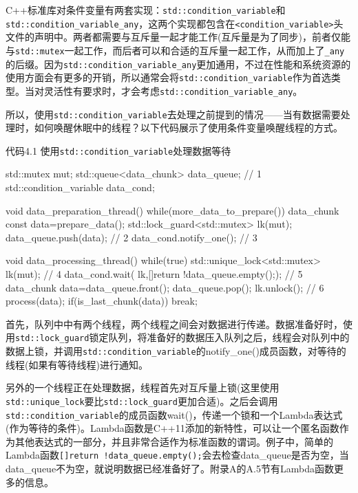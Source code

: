C++标准库对条件变量有两套实现：\texttt{std::condition\_variable}和\texttt{std::condition\_variable\_any}，这两个实现都包含在\texttt{<condition\_variable>}头文件的声明中。两者都需要与互斥量一起才能工作(互斥量是为了同步)，前者仅能与\texttt{std::mutex}一起工作，而后者可以和合适的互斥量一起工作，从而加上了\texttt{\_any}的后缀。因为\texttt{std::condition\_variable\_any}更加通用，不过在性能和系统资源的使用方面会有更多的开销，所以通常会将\texttt{std::condition\_variable}作为首选类型。当对灵活性有要求时，才会考虑\texttt{std::condition\_variable\_any}。

所以，使用\texttt{std::condition\_variable}去处理之前提到的情况——当有数据需要处理时，如何唤醒休眠中的线程？以下代码展示了使用条件变量唤醒线程的方式。

代码4.1 使用\texttt{std::condition\_variable}处理数据等待

\begin{cpp}
std::mutex mut;
std::queue<data_chunk> data_queue;  // 1
std::condition_variable data_cond;

void data_preparation_thread()
{
  while(more_data_to_prepare())
  {
    data_chunk const data=prepare_data();
    std::lock_guard<std::mutex> lk(mut);
    data_queue.push(data);  // 2
    data_cond.notify_one();  // 3
  }
}

void data_processing_thread()
{
  while(true)
  {
    std::unique_lock<std::mutex> lk(mut);  // 4
    data_cond.wait(
         lk,[]{return !data_queue.empty();});  // 5
    data_chunk data=data_queue.front();
    data_queue.pop();
    lk.unlock();  // 6
    process(data);
    if(is_last_chunk(data))
      break;
  }
}
\end{cpp}

首先，队列中中有两个线程，两个线程之间会对数据进行传递。数据准备好时，使用\texttt{std::lock\_guard}锁定队列，将准备好的数据压入队列之后，线程会对队列中的数据上锁，并调用\texttt{std::condition\_variable}的notify\_one()成员函数，对等待的线程(如果有等待线程)进行通知。

另外的一个线程正在处理数据，线程首先对互斥量上锁(这里使用\texttt{std::unique\_lock}要比\texttt{std::lock\_guard}更加合适)。之后会调用\texttt{std::condition\_variable}的成员函数wait()，传递一个锁和一个Lambda表达式(作为等待的条件)。Lambda函数是C++11添加的新特性，可以让一个匿名函数作为其他表达式的一部分，并且非常合适作为标准函数的谓词。例子中，简单的Lambda函数\texttt{[]{return !data\_queue.empty();}}会去检查data\_queue是否为空，当data\_queue不为空，就说明数据已经准备好了。附录A的A.5节有Lambda函数更多的信息。

